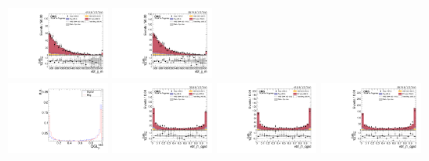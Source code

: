 \begin{figure}[!ht]
  \includegraphics[width=0.235\textwidth]{analysis_plots/2017_zv/cr_vjets_l/vbf_jj_m.pdf} \hspace{-12pt}
  \includegraphics[width=0.235\textwidth]{analysis_plots/2018_zv/cr_vjets_l/vbf_jj_m.pdf} \hspace{-12pt} \\ \vspace{-1pt}
  \includegraphics[width=0.235\textwidth]{analysis_plots/tmva_plots/zv_BDTG14_vbf1_AK4_qgid.pdf} \hspace{-12pt}
  \includegraphics[width=0.235\textwidth]{analysis_plots/2016_zv/cr_vjets_l/vbf_j1_qgid.pdf} \hspace{-12pt}
  \includegraphics[width=0.235\textwidth]{analysis_plots/2017_zv/cr_vjets_l/vbf_j1_qgid.pdf} \hspace{-12pt}
  \includegraphics[width=0.235\textwidth]{analysis_plots/2018_zv/cr_vjets_l/vbf_j1_qgid.pdf} \hspace{-12pt} \\ \vspace{-1pt}

\end{figure}
